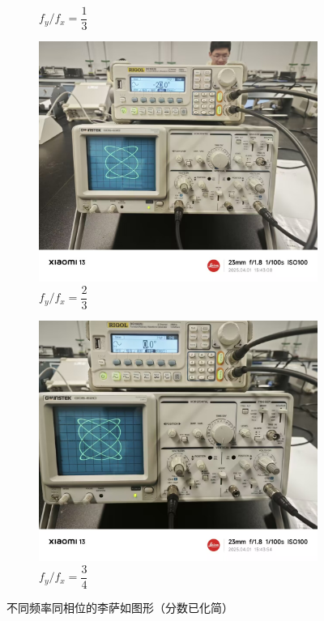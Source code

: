 \documentclass[12pt,a4paper]{article}
\begin{document}
\begin{figure}[H]
\begin{subfigure}[b]{0.23\textwidth}
			\caption{$f_y/f_x=\dfrac{1}{3}$}
			\label{fig:subLissajous2-2}
		\end{subfigure}
		\hfill
		\begin{subfigure}[b]{0.23\textwidth}
			\centering
			\includegraphics[width=\textwidth]{800.jpg}
			\caption{$f_y/f_x=\dfrac{2}{3}$}
			\label{fig:subLissajous3-2}
		\end{subfigure}
		\hfill
		\begin{subfigure}[b]{0.23\textwidth}
			\centering
			\includegraphics[width=\textwidth]{900.jpg}
			\caption{$f_y/f_x=\dfrac{3}{4}$}
			\label{fig:subLissajous4-2}
		\end{subfigure}
		
		\caption{不同频率同相位的李萨如图形（分数已化简）}
		\label{fig:chart3-simplified}
	\end{figure}
\end{document}

